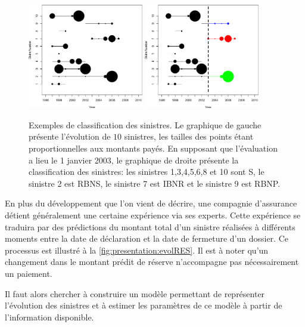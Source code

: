\begin{figure}
  \centering
  \includegraphics[height=0.45\textwidth, width=0.45\textwidth]{images/E1a}
  \includegraphics[height=0.45\textwidth, width=0.45\textwidth]{images/E2a}
  \caption{Exemples de classification des sinistres. Le graphique de
    gauche présente l'évolution de $10$ sinistres, les tailles des
    points étant proportionnelles aux montants payés. En supposant que
    l'évaluation a lieu le 1 janvier 2003, le graphique de droite
    présente la classification des sinistres: les sinistres
    1,3,4,5,6,8 et 10 sont S, le sinistre 2 est RBNS, le sinistre 7
    est IBNR et le sinistre 9 est RBNP.}
  \label{fig:presentation:E1E2}
\end{figure}

En plus du développement que l'on vient de décrire, une compagnie
d'assurance détient généralement une certaine expérience via ses
experts. Cette expérience se traduira par des prédictions du montant
total d'un sinistre réalisées à différents moments entre la date de
déclaration et la date de fermeture d'un dossier. Ce processus est
illustré à la \autoref{fig:presentation:evolRES}. Il est à noter qu'un
changement dans le montant prédit de réserve n'accompagne pas
nécessairement un paiement.

Il faut alors chercher à construire un modèle permettant de
représenter l'évolution des sinistres et à estimer les paramètres de
ce modèle à partir de l'information disponible.

